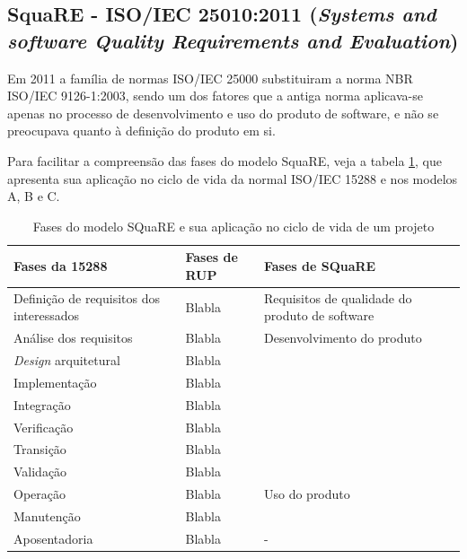\documentclass[
	12pt,				%
	openright,			%
	twoside,			%
	a4paper,			%
	english,			%
	brazil,				%
	]{abntex2}
\begin{document}
\subsection{SquaRE - ISO/IEC 25010:2011 (\emph{Systems and software Quality Requirements
and Evaluation})}
Em 2011 a família de normas ISO/IEC 25000 substituiram a norma NBR ISO/IEC 9126-1:2003, sendo um dos fatores que a antiga norma aplicava-se apenas no processo de desenvolvimento e uso do produto de software, e não se preocupava quanto à definição do produto em si.

Para facilitar a compreensão das fases do modelo SquaRE, veja a tabela \ref{tab:fases_square}, que apresenta sua aplicação no ciclo de vida da normal ISO/IEC 15288 e nos modelos A, B e C. %

\begin{table}[H]
    \caption{Fases do modelo SQuaRE e sua aplicação no ciclo de vida de um projeto}
    \label{tab:fases_square}
    \begin{tabular}{p{4.9cm}|p{4.9cm}|p{4.9cm}}
        \textbf{Fases da 15288} & \textbf{Fases de RUP} & \textbf{Fases de SQuaRE} \\ \hline
        Definição de requisitos dos interessados & Blabla & Requisitos de qualidade do produto de software\\ \hline
        Análise dos requisitos & Blabla & Desenvolvimento do produto \\
        \emph{Design} arquitetural & Blabla & \\
        Implementação & Blabla & \\
        Integração & Blabla & \\
        Verificação & Blabla & \\
        Transição & Blabla & \\
        Validação & Blabla & \\ \hline
        Operação & Blabla & Uso do produto \\
        Manutenção & Blabla & \\ \hline
        Aposentadoria & Blabla & -
  \end{tabular}
\end{table}

\end{document}
